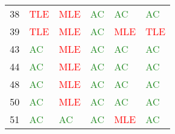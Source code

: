 \documentclass[thesis=M,english,hidelinks]{FITthesis}[2012/10/20]
\theoremstyle{definition}
\begin{document}
\begin{table}[ht]
\begin{tabular}{ m{1cm} | m{1.5cm} m{1.5cm} m{1.5cm} m{1.5cm} m{1.5cm} }
        38 & \textcolor{Red}{TLE} & \textcolor{Red}{MLE} & \textcolor{ForestGreen}{AC} & \textcolor{ForestGreen}{AC} & \textcolor{ForestGreen}{AC} \\
        39 & \textcolor{Red}{TLE} & \textcolor{Red}{MLE} & \textcolor{ForestGreen}{AC} & \textcolor{Red}{MLE} & \textcolor{Red}{TLE} \\
        43 & \textcolor{ForestGreen}{AC} & \textcolor{Red}{MLE} & \textcolor{ForestGreen}{AC} & \textcolor{ForestGreen}{AC} & \textcolor{ForestGreen}{AC} \\
        44 & \textcolor{ForestGreen}{AC} & \textcolor{Red}{MLE} & \textcolor{ForestGreen}{AC} & \textcolor{ForestGreen}{AC} & \textcolor{ForestGreen}{AC} \\
        48 & \textcolor{ForestGreen}{AC} & \textcolor{Red}{MLE} & \textcolor{ForestGreen}{AC} & \textcolor{ForestGreen}{AC} & \textcolor{ForestGreen}{AC} \\
        50 & \textcolor{ForestGreen}{AC} & \textcolor{Red}{MLE} & \textcolor{ForestGreen}{AC} & \textcolor{ForestGreen}{AC} & \textcolor{ForestGreen}{AC} \\
        51 & \textcolor{ForestGreen}{AC} & \textcolor{ForestGreen}{AC} & \textcolor{ForestGreen}{AC} & \textcolor{Red}{MLE} & \textcolor{ForestGreen}{AC} \\

\end{tabular}
\end{table}
\end{document}
